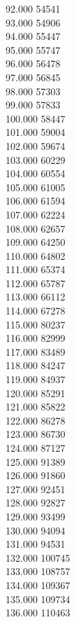 { 92.000	54541 \\
 93.000	54906 \\
 94.000	55447 \\
 95.000	55747 \\
 96.000	56478 \\
 97.000	56845 \\
 98.000	57303 \\
 99.000	57833 \\
 100.000	58447 \\
 101.000	59004 \\
 102.000	59674 \\
 103.000	60229 \\
 104.000	60554 \\
 105.000	61005 \\
 106.000	61594 \\
 107.000	62224 \\
 108.000	62657 \\
 109.000	64250 \\
 110.000	64802 \\
 111.000	65374 \\
 112.000	65787 \\
 113.000	66112 \\
 114.000	67278 \\
 115.000	80237 \\
 116.000	82999 \\
 117.000	83489 \\
 118.000	84247 \\
 119.000	84937 \\
 120.000	85291 \\
 121.000	85822 \\
 122.000	86278 \\
 123.000	86730 \\
 124.000	87127 \\
 125.000	91389 \\
 126.000	91860 \\
 127.000	92451 \\
 128.000	92827 \\
 129.000	93499 \\
 130.000	94094 \\
 131.000	94531 \\
 132.000	100745 \\
 133.000	108757 \\
 134.000	109367 \\
 135.000	109734 \\
 136.000	110463 \\
}

